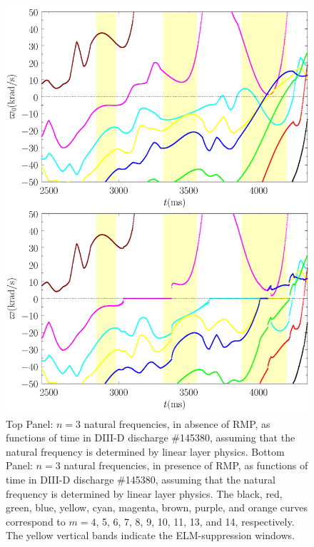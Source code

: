 \documentclass[12pt,prb,aps]{revtex4-1}
\begin{document}
\begin{figure}
\includegraphics[height=6in]{fig11.pdf}
\caption{Top Panel: $n=3$ natural frequencies, in absence of RMP, as functions of time
in   DIII-D discharge \#145380, assuming that the natural frequency is determined by linear layer physics.
Bottom Panel:  $n=3$ natural frequencies, in presence of RMP, as functions of time
in   DIII-D discharge \#145380, assuming that the natural frequency is determined by linear layer physics. The black, red, green, blue, yellow, cyan, magenta,  brown, 
purple, and orange curves correspond to $m=4$, 5, 6, 7, 8, 9, 10,  11, 13, and 14, respectively. The yellow vertical bands indicate the ELM-suppression windows.} \label{fig11}
\end{figure}
\end{document}
